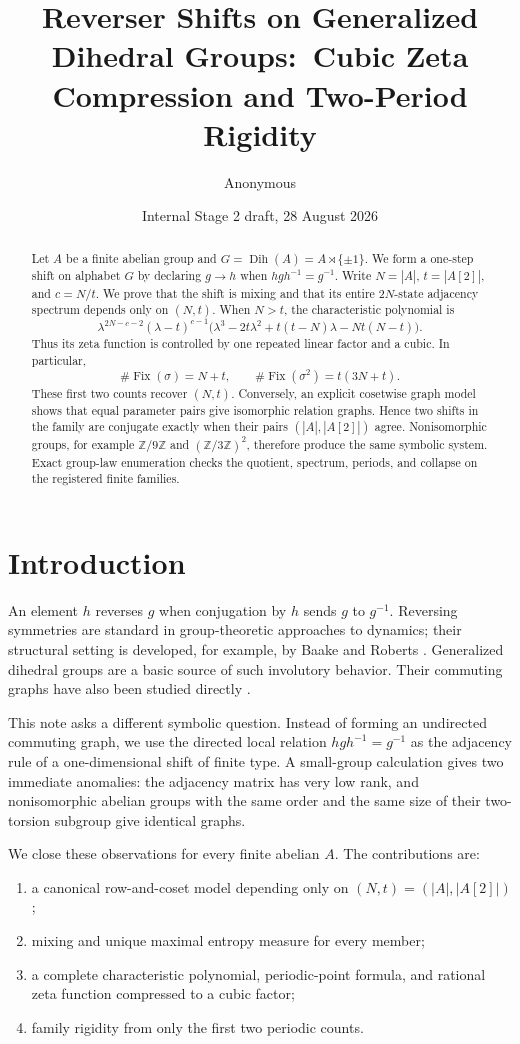 \documentclass[11pt,a4paper]{amsart}
\title[Generalized-dihedral reverser shifts]{Reverser Shifts on Generalized Dihedral Groups:\ Cubic Zeta Compression and Two-Period Rigidity}
\author{Anonymous}
\date{Internal Stage 2 draft, 28 August 2026}
\theoremstyle{definition}
\theoremstyle{remark}
\newcommand{\Fix}{\operatorname{Fix}}
\newcommand{\Dih}{\operatorname{Dih}}
\newcommand{\Z}{\mathbb Z}
\begin{document}
\begin{abstract}
Let $A$ be a finite abelian group and
$G=\Dih(A)=A\rtimes\{\pm1\}$.  We form a one-step shift on alphabet $G$ by
declaring $g\to h$ when $hgh^{-1}=g^{-1}$.  Write
$N=|A|$, $t=|A[2]|$, and $c=N/t$.  We prove that the shift is mixing and that
its entire $2N$-state adjacency spectrum depends only on $(N,t)$.  When
$N>t$, the characteristic polynomial is
\[
 \lambda^{2N-c-2}(\lambda-t)^{c-1}
 \bigl(\lambda^3-2t\lambda^2+t(t-N)\lambda-Nt(N-t)\bigr).
\]
Thus its zeta function is controlled by one repeated linear factor and a
cubic.  In particular,
\[
 \#\Fix(\sigma)=N+t,\qquad
 \#\Fix(\sigma^2)=t(3N+t).
\]
These first two counts recover $(N,t)$.  Conversely, an explicit cosetwise
graph model shows that equal parameter pairs give isomorphic relation graphs.
Hence two shifts in the family are conjugate exactly when their pairs
$(|A|,|A[2]|)$ agree.  Nonisomorphic groups, for example $\Z/9\Z$ and
$(\Z/3\Z)^2$, therefore produce the same symbolic system.  Exact group-law
enumeration checks the quotient, spectrum, periods, and collapse on the
registered finite families.
\end{abstract}

\maketitle

\section{Introduction}

An element $h$ reverses $g$ when conjugation by $h$ sends $g$ to $g^{-1}$.
Reversing symmetries are standard in group-theoretic approaches to dynamics;
their structural setting is developed, for example, by Baake and Roberts
\cite{BaakeRoberts2006}.  Generalized dihedral groups are a basic source of
such involutory behavior.  Their commuting graphs have also been studied
directly \cite{KakkarRawat2018}.

This note asks a different symbolic question.  Instead of forming an
undirected commuting graph, we use the directed local relation
$hgh^{-1}=g^{-1}$ as the adjacency rule of a one-dimensional shift of finite
type.  A small-group calculation gives two immediate anomalies: the adjacency
matrix has very low rank, and nonisomorphic abelian groups with the same order
and the same size of their two-torsion subgroup give identical graphs.

We close these observations for every finite abelian $A$.  The contributions
are:
\begin{enumerate}
\item a canonical row-and-coset model depending only on
$(N,t)=(|A|,|A[2]|)$;
\item mixing and unique maximal entropy measure for every member;
\item a complete characteristic polynomial, periodic-point formula, and
rational zeta function compressed to a cubic factor;
\item family rigidity from only the first two periodic counts.
\end{enumerate}
\end{document}
